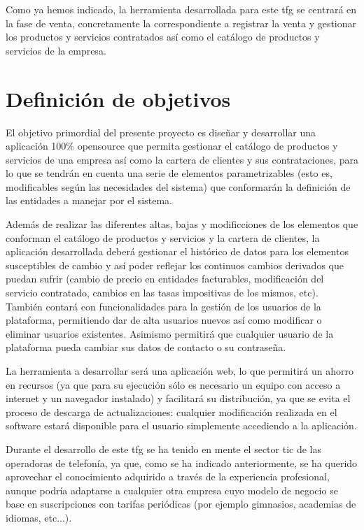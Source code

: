 Como ya hemos indicado, la herramienta desarrollada para este \acrshort{tfg} se centrará en la fase de venta, concretamente la correspondiente a registrar la venta y gestionar los productos y servicios contratados así como el catálogo de productos y servicios de la empresa.


\section{Definición de objetivos}
\label{sec:objetivos}


El objetivo primordial del presente proyecto es diseñar y desarrollar una aplicación 100\% \gls{opensource} que permita gestionar el catálogo de productos y servicios de una empresa así como la cartera de clientes y sus contrataciones, para lo que se tendrán en cuenta una serie de elementos parametrizables (esto es, modificables según las necesidades del sistema) que conformarán la definición de las entidades a manejar por el sistema.

Además de realizar las diferentes altas, bajas y modificciones de los elementos que conforman el catálogo de productos y servicios y la cartera de clientes, la aplicación desarrollada deberá gestionar el histórico de datos para los elementos susceptibles de cambio y así poder reflejar los continuos cambios derivados que puedan sufrir (cambio de precio en entidades facturables, modificación del servicio contratado, cambios en las tasas impositivas de los mismos, etc). También contará con funcionalidades para la gestión de los usuarios de la plataforma, permitiendo dar de alta usuarios nuevos así como modificar o eliminar usuarios existentes. Asimismo permitirá que cualquier usuario de la plataforma pueda cambiar sus datos de contacto o su contraseña.

La herramienta a desarrollar será una aplicación web, lo que permitirá un ahorro en recursos (ya que para su ejecución sólo es necesario un equipo con acceso a internet y un navegador instalado) y facilitará su distribución, ya que se evita el proceso de descarga de actualizaciones: cualquier modificación realizada en el software estará disponible para el usuario simplemente accediendo a la aplicación.

Durante el desarrollo de este \acrshort{tfg} se ha tenido en mente el sector \acrshort{tic} de las operadoras de telefonía, ya que, como se ha indicado anteriormente, se ha querido aprovechar el conocimiento adquirido a través de la experiencia profesional, aunque podría adaptarse a cualquier otra empresa cuyo modelo de negocio se base en suscripciones con tarifas periódicas (por ejemplo gimnasios, academias de idiomas, etc...).


